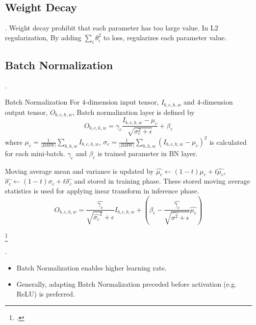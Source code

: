 \documentclass[8pt]{beamer}
\newcommand{\abs}[1]{\left\lvert #1 \right\rvert}
\begin{document}
\subsection{Weight Decay}
\begin{frame}{.}
    Weight decay prohibit that each parameter has too large value.
    In L2 regularization, By adding $\sum_i \theta_i^2$ to loss, regularizes each parameter value.
\end{frame}

\subsection{Batch Normalization}


\begin{frame}{.}

    \begin{block}{Batch Normalization}
        For $4$-dimension input tensor, $I_{b,c,h,w}$ and $4$-dimension output tensor, $O_{b,c,h,w}$, Batch normalization layer is defined by
        \[
            O_{b,c,h,w} = \gamma_c \frac{I_{b,c,h,w} - \mu_c}{\sqrt{\sigma^2_c + \epsilon}} + \beta_c
        \]
        where $\mu_c = \frac{1}{\abs{BHW} } \sum_{b,h,w} I_{b,c,h,w}$, $\sigma_c = \frac{1}{\abs{BHW}} \sum_{b,h,w} (I_{b,c,h,w} - \mu_c)^2$ is calculated for each mini-batch. $\gamma_c$ and $\beta_c$ is trained parameter in BN layer.

        \smallskip
        Moving average mean and variance is updated by $\hat{\mu_c} \leftarrow (1-t)\mu_c + t\hat{\mu_c}$, $\hat{\sigma_c} \leftarrow (1-t) \sigma_c + t \hat{\sigma_c}$ and stored in training phase. These stored moving average statistics is used for applying inear transform in inference phase.
        \[
            O_{b,c,h,w} = \frac{\hat{\gamma_c}}{\sqrt{\hat{\sigma_c}^2}+ \epsilon} I_{b,c,h,w} + \left(\beta_c  - \frac{\hat{\gamma_c}}{\sqrt{\hat{\sigma^2} + \epsilon}}\hat{\mu_c}\right)
        \]
    \end{block}


    \footcite{Understanding_Batch_Normalization_nips_2018,ioffe2015batch}
\end{frame}

\begin{frame}{.}
    \begin{itemize}
        \item Batch Normalization enables higher learning rate.
        \item Generally, adapting Batch Normalization preceded before activation (e.g. ReLU) is preferred.
    \end{itemize}
\end{frame}
\end{document}
